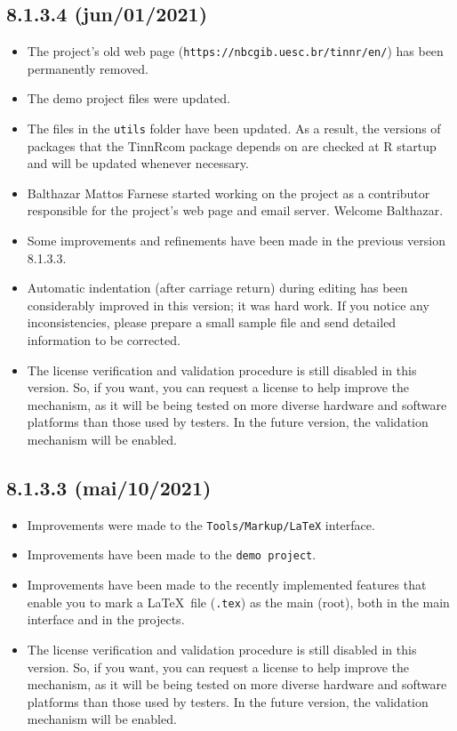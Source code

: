 \subsection*{8.1.3.4 (jun/01/2021)}
\begin{itemize}
  \item The project's old web page (\texttt{https://nbcgib.uesc.br/tinnr/en/}) has been permanently
    removed.
  \item The demo project files were updated.
  \item The files in the \texttt{utils} folder have been updated. As a result, the versions of
    packages that the TinnRcom package depends on are checked at R startup and will be updated
    whenever necessary.
  \item Balthazar Mattos Farnese started working on the project as a contributor responsible
    for the project's web page and email server. Welcome Balthazar.
  \item Some improvements and refinements have been made in the previous version 8.1.3.3.
		\item Automatic indentation (after carriage return) during editing has been considerably
    improved in this version; it was hard work. If you notice any inconsistencies,
    please prepare a small sample file and send detailed information to be corrected.
  \item The license verification and validation procedure is still disabled in this version.
    So, if you want, you can request a license to help improve the mechanism,
    as it will be being tested on more diverse hardware and software platforms than
    those used by testers. In the future version, the validation mechanism will be enabled.
\end{itemize}

\subsection*{8.1.3.3 (mai/10/2021)}
\begin{itemize}
  \item Improvements were made to the \texttt{Tools/Markup/LaTeX} interface.
  \item Improvements have been made to the \texttt{demo project}.
  \item Improvements have been made to the recently implemented features that enable you to
    mark a \LaTeX ~file (\texttt{.tex}) as the main (root), both in the main interface and in
    the projects.
  \item The license verification and validation procedure is still disabled in this version.
    So, if you want, you can request a license to help improve the mechanism,
    as it will be being tested on more diverse hardware and software platforms than
    those used by testers. In the future version, the validation mechanism will be enabled.
\end{itemize}

